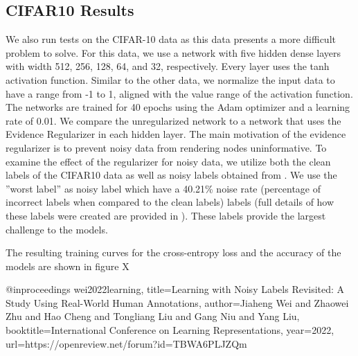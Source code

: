 
\subsection{CIFAR10 Results}

We also run tests on the CIFAR-10 data as this data presents a more difficult problem to solve. For this data, we use a network with five hidden dense layers with width 512, 256, 128, 64, and 32, respectively. Every layer uses the tanh activation function. Similar to the other data, we normalize the input data to have a range from -1 to 1, aligned with the value range of the activation function. The networks are trained for 40 epochs using the Adam optimizer and a learning rate of 0.01.
We compare the unregularized network to a network that uses the Evidence Regularizer in each hidden layer.
The main motivation of the evidence regularizer is to prevent noisy data from rendering nodes uninformative. To examine the effect of the regularizer for noisy data, we utilize both the clean labels of the CIFAR10 data as well as noisy labels obtained from \cite{wei2022learning}. We use the ''worst label'' as noisy label which have a 40.21\% noise rate (percentage of incorrect labels when compared to the clean labels) labels (full details of how these labels were created are provided in \cite{wei2022learning}). These labels provide the largest challenge to the models.



The resulting training curves for the cross-entropy loss and the accuracy of the models are shown in figure X




@inproceedings{
wei2022learning,
title={Learning with Noisy Labels Revisited: A Study Using Real-World Human Annotations},
author={Jiaheng Wei and Zhaowei Zhu and Hao Cheng and Tongliang Liu and Gang Niu and Yang Liu},
booktitle={International Conference on Learning Representations},
year={2022},
url={https://openreview.net/forum?id=TBWA6PLJZQm}
}
